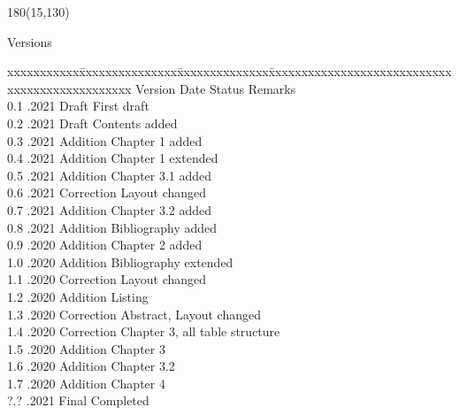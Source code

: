 
\begin{textblock}{180}(15,130)
\color{black}
\begin{huge}
Versions
\end{huge}
\vspace{5mm}

\fontsize{10pt}{18pt}\selectfont
\begin{tabbing}
xxxxxxxxxxx\=xxxxxxxxxxxxxxx\=xxxxxxxxxxxxxx\=xxxxxxxxxxxxxxxxxxxxxxxxxxxxxxxxxxxxxxxxxxxxxxx \kill
Version	\> Date	\> Status			\> Remarks		\\
0.1 .2021 \> Draft      \> First draft           \\
0.2 .2021 \> Draft      \> Contents added        \\
0.3 .2021 \> Addition   \> Chapter 1 added       \\
0.4 .2021 \> Addition   \> Chapter 1 extended    \\
0.5 .2021 \> Addition   \> Chapter 3.1 added     \\
0.6 .2021 \> Correction \> Layout changed        \\
0.7 .2021 \> Addition   \> Chapter 3.2 added     \\
0.8 .2021 \> Addition   \> Bibliography added    \\
0.9 .2020 \> Addition   \> Chapter 2 added       \\
1.0 .2020 \> Addition   \> Bibliography extended \\
1.1 .2020 \> Correction \> Layout changed        \\
1.2 .2020 \> Addition   \> Listing               \\
1.3 .2020 \> Correction \> Abstract, Layout changed        \\
1.4 .2020 \> Correction	\> Chapter 3, all table structure	 \\
1.5 .2020 \> Addition	\> Chapter 3			 \\
1.6 .2020 \> Addition	\> Chapter 3.2 			 \\
1.7 .2020 \> Addition	\> Chapter 4			 \\
?.? .2021 \> Final      \> Completed             \\
\end{tabbing}

\end{textblock}